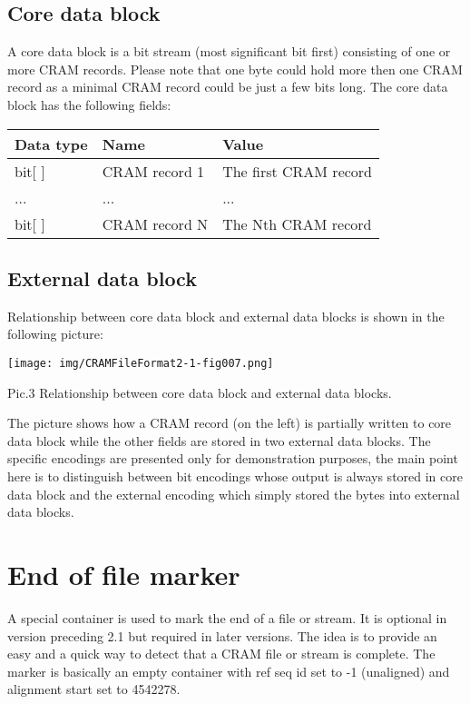 \documentclass[a4paper]{article}
\begin{document}
\subsection{\textbf{Core data block}}

A core data block is a bit stream (most significant bit first) consisting of one 
or more CRAM records. Please note that one byte could hold more then one CRAM record 
as a minimal CRAM record could be just a few bits long. The core data block has 
the following fields:

\begin{tabular}{|l|>{\raggedright}p{120pt}|>{\raggedright}p{260pt}|}
\hline
\textbf{Data type} & \textbf{Name} & \textbf{Value}
\tabularnewline
\hline
bit[ ] & CRAM record 1 & The first CRAM record\tabularnewline
\hline
... & ... & ...\tabularnewline
\hline
bit[ ] & CRAM record N & The Nth CRAM record \tabularnewline
\hline
\end{tabular}

\subsection{\textbf{External data block}}

Relationship between core data block and external data blocks is shown in the following 
picture: 

\texttt{[image: img/CRAMFileFormat2-1-fig007.png]}

Pic.3 Relationship between core data block and external data blocks.

The picture shows how a CRAM record (on the left) is partially written to core 
data block while the other fields are stored in two external data blocks. The specific 
encodings are presented only for demonstration purposes, the main point here is 
to distinguish between bit encodings whose output is always stored in core data 
block and the external encoding which simply stored the bytes into external data 
blocks.

\section{\textbf{End of file marker}}

A special container is used to mark the end of a file or stream. It is optional 
in version preceding 2.1 but required in later versions. The idea is to provide 
an easy and a quick way to detect that a CRAM file or stream is complete. The marker 
is basically an empty container with ref seq id set to -1 (unaligned) and alignment 
start set to 4542278.
\end{document}
